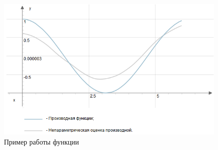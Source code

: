  \begin{figure} [h] 
   \center
   \includegraphics {HML_NonparametricEstimatorOfDerivative6.png}
   \caption{Пример работы функции} 
   \label{img:HML_NonparametricEstimatorOfDerivative6}  
 \end{figure}